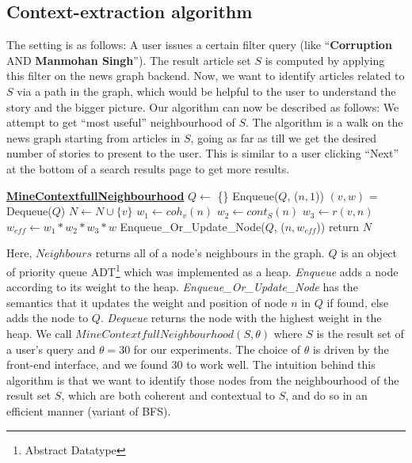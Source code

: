 \subsection{Context-extraction algorithm}
The setting is as follows: A user issues a certain filter query (like ``{\bf Corruption} AND {\bf Manmohan Singh}''). The result article set $S$ is computed by applying this filter on the news graph backend. Now, we want to identify articles
related to $S$ via a path in the graph, which would be helpful to the user to understand the story and the bigger picture.
Our algorithm can now be described as follows: We attempt to get ``most useful'' neighbourhood of $S$. The algorithm is a walk on the news graph starting from articles in $S$, 
going as far as till we get the desired number of stories to present to the user. This is similar to a user clicking ``Next'' at the bottom of a search results page to get more results. 

\begin{algorithmic}
  \State \textbf{\underline{MineContextfullNeighbourhood}}
  \State {}
  \State {}
    \State $Q \leftarrow$ \{\} 
      \State Enqueue($Q$, ($n, 1$))
    \EndFor
      \State $(v, w)$ = Dequeue($Q$)
      \State $N \leftarrow N \cup \{v\}$
        \State $w_1 \leftarrow coh_{v}(n)$
        \State $w_2 \leftarrow cont_{S}(n)$
        \State $w_3 \leftarrow r(v,n)$
        \State $w_{eff} \leftarrow w_1 * w_2 * w_3 * w$
        \State Enqueue\_Or\_Update\_Node($Q$, ($n, w_{eff}$))
      \EndFor
    \EndWhile
    \State return $N$
\end{algorithmic}

Here, $Neighbours$ returns all of a node's neighbours in the graph. $Q$ is an object of priority queue ADT\footnote{Abstract Datatype} which was implemented as a heap. \emph{Enqueue} adds a node according to its weight to the heap. \emph{Enqueue\_Or\_Update\_Node} has the semantics that it updates the weight and position of node $n$ in $Q$ if found, else adds the node to $Q$.
\emph{Dequeue} returns the node with the highest weight in the heap. We call $MineContextfullNeighbourhood(S, \theta)$ where $S$ is the result set of a user's query and $\theta = 30$ for our experiments. The choice of $\theta$ is driven by the front-end interface, and we found 30 to work well.
The intuition behind this algorithm is that we want to identify those nodes from the neighbourhood of the result set $S$, which are both coherent and contextual to $S$, and do so in an efficient manner (variant of BFS).

